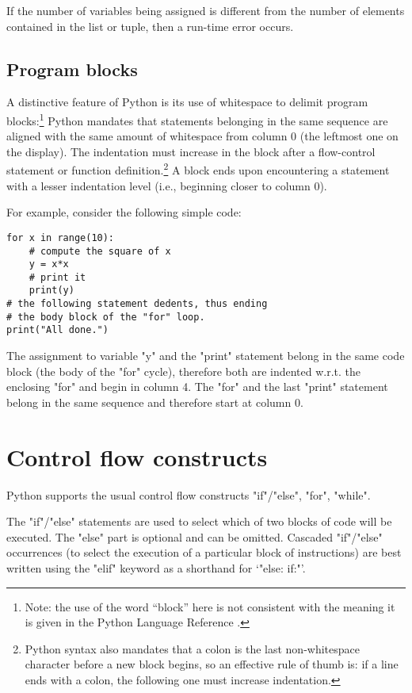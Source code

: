 {If the number of variables being assigned is different from the number
of elements contained in the list or tuple, then a run-time error
occurs.


\subsection{Program blocks}
\label{sec:code-blocks}

A distinctive feature of Python is its use of whitespace to delimit
program blocks:\footnote{Note: the use of the word ``block'' here is
  not consistent with the meaning it is given in the Python Language
  Reference \cite{python:reference}.}  Python mandates that statements
belonging in the same sequence are aligned with the same amount of
whitespace from column 0 (the leftmost one on the display).  The
indentation must increase in the block after a flow-control statement
or function definition.\footnote{Python syntax also mandates that a
  colon \q{:} is the last non-whitespace character before a new block
  begins, so an effective rule of thumb is: if a line ends with a
  colon, the following one must increase indentation.}  A block ends
upon encountering a statement with a lesser indentation level (i.e.,
beginning closer to column 0).

For example, consider the following simple code:
\begin{lstlisting}
for x in range(10):
    # compute the square of x
    y = x*x
    # print it
    print(y)
# the following statement dedents, thus ending
# the body block of the "for" loop.
print("All done.")
\end{lstlisting}
The assignment to variable "y" and the "print" statement belong in the
same code block (the body of the "for" cycle), therefore both are
indented w.r.t. the enclosing "for" and begin in column 4.  The "for"
and the last "print" statement belong in the same sequence and
therefore start at column 0.


\section{Control flow constructs}
\label{sec:control-flow}

Python supports the usual control flow constructs
"if"/"else", "for", "while".

The "if"/"else" statements are used to select which of two
blocks of code will be executed.  The "else" part is optional and
can be omitted.  Cascaded "if"/"else" occurrences (to
select the execution of a particular block of instructions) are best
written using the "elif" keyword as a shorthand for 
`"else: if:"'. 

}
